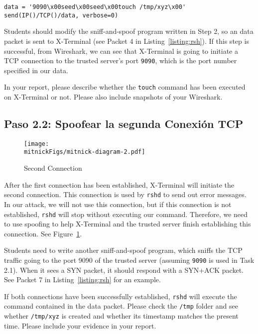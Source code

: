 \begin{lstlisting}
data = '9090\x00seed\x00seed\x00touch /tmp/xyz\x00'
send(IP()/TCP()/data, verbose=0)
\end{lstlisting}
 

Students should modify the sniff-and-spoof program written in Step 2, so
an \rsh data packet is sent to X-Terminal (see Packet 4 
in Listing~\ref{listing:rsh}). 
If this step is successful, from Wireshark, we can see
that X-Terminal is going to initiate a TCP connection to the trusted server's port
\texttt{9090}, which is the port number specified in our \rsh data.  

In your report, please describe whether the \texttt{touch} command 
has been executed on X-Terminal or not. Please also 
include snapshots of your Wireshark. 


\subsection{Paso 2.2: Spoofear la segunda Conexión TCP}
\label{sec:second-conn}

\begin{figure}[htb]
\centering
\texttt{[image: \\mitnickFigs/mitnick-diagram-2.pdf]}
\caption{Second Connection}
\label{fig:second-conn}
\end{figure}


After the first connection has been established, X-Terminal will initiate 
the second connection. This connection is used by \texttt{rshd} to send 
out error messages. In our attack, we will not use this connection, but
if this connection is not established, \texttt{rshd} will stop without 
executing our command. Therefore, we need to use spoofing 
to help X-Terminal and the trusted server finish establishing this connection. 
See Figure~\ref{fig:second-conn}. 


Students need to write another sniff-and-spoof program, which
sniffs the TCP traffic going to the port 9090 of the trusted server (assuming
\texttt{9090} is used in Task 2.1). When it sees a SYN packet,
it should respond with a SYN+ACK packet. See Packet 7 
in Listing~\ref{listing:rsh} for an example.

If both connections have been successfully established, \texttt{rshd} 
will execute the command contained in the \rsh data packet. Please 
check the \texttt{/tmp} folder and see whether \texttt{/tmp/xyz} is created
and whether its timestamp matches the present time. Please 
include your evidence in your report. 




